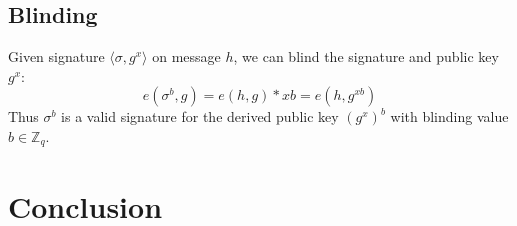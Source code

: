 \documentclass[a4paper,12pt]{scrartcl}
\begin{document}
\subsection{Blinding}
Given signature \( \langle \sigma, g^x \rangle \) on message \( h \), we can blind the signature and public key \( g^x \):
\[ e(\sigma^b,g) = e(h,g)*{xb} = e(h,g^{xb}) \]
Thus \( \sigma^b \) is a valid signature for the derived public key \( (g^x)^b \) with blinding value \( b \in \mathbb{Z}_{q} \).\cite[PKI Slide 12]{crypto-slides-grothoff}
\pagebreak

\section{Conclusion}

\printbibliography
\end{document}
